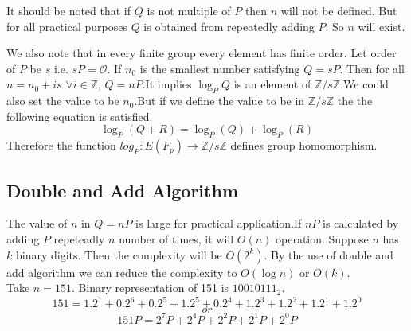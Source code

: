 \documentclass[12pt,a4paper]{report}
\begin{document}
It should be noted that if $Q$ is not multiple of $P$ then $n$ will not be defined. But for all practical purposes $Q$ is obtained from repeatedly adding $P$. So $n$ will exist.

We also note that in every finite group every element has finite order. Let order of $P$ be $s$ i.e. $s P=\mathscr{O}$. If $n_0$ is the smallest number satisfying $Q=sP$. Then for all $n=n_0+is$ $ \forall i \in \mathbb{Z} $, $Q=nP$.It implies $\log_P Q$ is an element of  $\mathbb{Z}/s\mathbb{Z}$.We could also set the value to be $n_0$.But if we define the value to be in $\mathbb{Z}/s\mathbb{Z}$ the the following equation is satisfied.
$$\log_P(Q+R)=\log_P(Q)+\log_P(R)$$
Therefore the function 
$log_P:E(F_p)\rightarrow \mathbb{Z}/s\mathbb{Z}$ defines group homomorphism.
\subsection{Double and Add Algorithm}
The value of $n$ in $Q=nP$ is large for practical application.If $nP$ is calculated by adding $P$ repeteadly $n$ number of times, it will $O(n)$ operation. Suppose $n$ has $k$ binary digits. Then the complexity will be $O(2^k)$. By the use of double and add algorithm we can reduce the complexity to $O(\log {n})$ or $O(k)$.\\
Take $n=151$. Binary representation of 151 is $10010111_2$.
$$151=1.2^7+0.2^6+0.2^5+1.2^5+0.2^4+1.2^3+1.2^2+1.2^1+1.2^0$$
$$or$$
$$151P = 2^7P+2^4P+2^2P+2^1P+2^0P$$
\cleardoublepage
\end{document}
